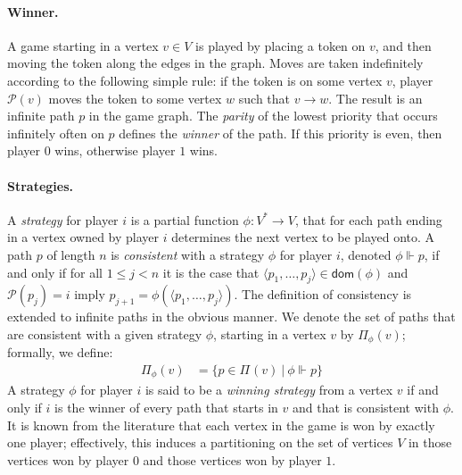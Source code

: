 \documentclass[a4paper]{llncs}
\newcommand{\even}{\ensuremath{0}\xspace}
\newcommand{\odd}{\ensuremath{1}\xspace}
\newcommand{\player}{\ensuremath{\mathit{i}}\xspace}
\newcommand{\getplayername}{\ensuremath{\mathcal{P}}}
\newcommand{\getplayer}[1]{\getplayername(#1)}
\newcommand{\prefixes}[3][]{\ensuremath{\Pi_{#2}^{#1}(#3)}}
\newcommand{\consistency}{\ensuremath{\Vdash}}
\newcommand{\consistent}[2]{\ensuremath{{#2}\consistency{#1}}}
\newcommand{\path}[1]{\ensuremath{\langle #1 \rangle}}
\newcommand{\dom}[1]{\mathsf{dom}(#1)}
\begin{document}
\paragraph{Winner.} A game starting in a vertex $v \in V$ is played by
placing a token on $v$, and then moving the token along the edges in the
graph. Moves are taken indefinitely according to the following simple
rule: if the token is on some vertex $v$, player $\getplayer{v}$ moves
the token to some vertex $w$ such that $v \to w$. The result is an
infinite path $p$ in the game graph.  The \emph{parity} of the lowest
priority that occurs infinitely often on $p$ defines the \emph{winner}
of the path. If this priority is even, then player $\even$ wins, otherwise
player $\odd$ wins.

\paragraph{Strategies.} A \emph{strategy} for player $\player$ is
a partial function $\phi : V^{*} \to V$, that for each path ending in a
vertex owned by player $\player$ determines the next vertex to be played
onto. A path $p$ of length $n$ is \emph{consistent} with a strategy $\phi$
for player $\player$, denoted $\consistent{p}{\phi}$, if and only if
for all $1 \leq j < n$ it is the case that $\path{p_1,\ldots,p_j}
\in \dom{\phi}$ and $\getplayer{p_j} = \player$ imply $p_{j+1} =
\phi(\path{p_1,\ldots,p_j})$. The definition of consistency is extended
to infinite paths in the obvious manner. We denote the set of paths that 
are consistent with a given strategy $\phi$, starting in a vertex $v$ by
$\prefixes{\phi}{v}$; formally, we define:
\begin{align*}
\prefixes{\phi}{v} & = \{ p \in \prefixes{}{v} ~|~ \consistent{p}{\phi} \}
\end{align*}
A strategy $\phi$ for player $\player$ is said
to be a \emph{winning strategy} from a vertex $v$ if and only if $\player$
is the winner of every path that starts in $v$ and that is consistent
with $\phi$. It is known from the literature that each vertex in the game
is won by exactly one player; effectively, this induces a partitioning
on the set of vertices $V$ in those vertices won by player $\even$ and
those vertices won by player $\odd$. 
\end{document}
